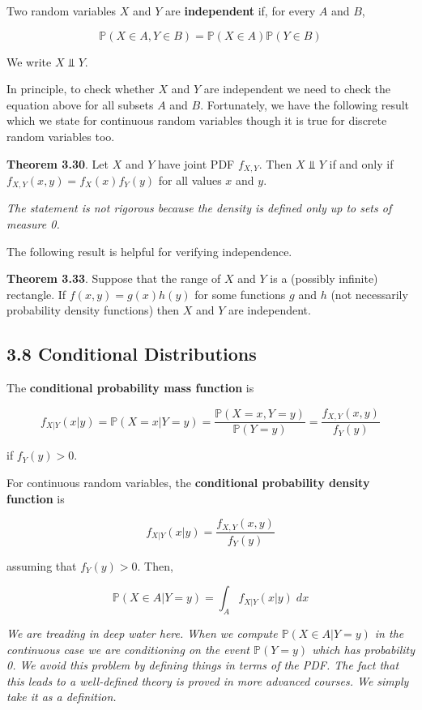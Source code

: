 Two random variables \(X\) and \(Y\) are \textbf{independent} if, for
every \(A\) and \(B\),

\[ \mathbb{P}(X \in A, Y \in B) = \mathbb{P}(X \in A) \mathbb{P}(Y \in B) \]

We write \(X \text{ ⫫ } Y\).

In principle, to check whether \(X\) and \(Y\) are independent we need
to check the equation above for all subsets \(A\) and \(B\).
Fortunately, we have the following result which we state for continuous
random variables though it is true for discrete random variables too.

\textbf{Theorem 3.30}. Let \(X\) and \(Y\) have joint PDF \(f_{X, Y}\).
Then \(X \text{ ⫫ } Y\) if and only if
\(f_{X, Y}(x, y) = f_X(x) f_Y(y)\) for all values \(x\) and \(y\).

\emph{The statement is not rigorous because the density is defined only
up to sets of measure 0.}

The following result is helpful for verifying independence.

\textbf{Theorem 3.33}. Suppose that the range of \(X\) and \(Y\) is a
(possibly infinite) rectangle. If \(f(x, y) = g(x) h(y)\) for some
functions \(g\) and \(h\) (not necessarily probability density
functions) then \(X\) and \(Y\) are independent.

\subsection{3.8 Conditional
Distributions}\label{conditional-distributions}

The \textbf{conditional probability mass function} is

\[ f_{X | Y}(x | y) = \mathbb{P}(X = x | Y = y) = \frac{\mathbb{P}(X = x, Y = y)}{\mathbb{P}(Y = y)} = \frac{f_{X, Y}(x, y)}{f_Y(y)} \]

if \(f_Y(y) > 0\).

For continuous random variables, the \textbf{conditional probability
density function} is

\[ f_{X | Y}(x | y) = \frac{f_{X, Y}(x, y)}{f_Y(y)} \]

assuming that \(f_Y(y) > 0\). Then,

\[ \mathbb{P}(X \in A | Y = y) = \int_A f_{X | Y}(x | y) \; dx \]

\emph{We are treading in deep water here. When we compute
\(\mathbb{P}(X \in A | Y = y)\) in the continuous case we are
conditioning on the event \(\mathbb{P}(Y = y)\) which has probability 0.
We avoid this problem by defining things in terms of the PDF. The fact
that this leads to a well-defined theory is proved in more advanced
courses. We simply take it as a definition.}

